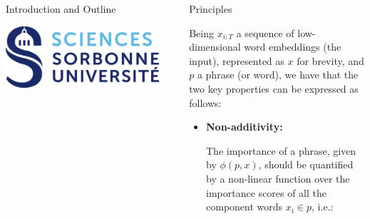 \documentclass[final]{beamer}
\newlength{\sepwid}
\newlength{\onecolwid}
\newlength{\twocolwid}
\begin{document}
\begin{frame}[t]
\begin{columns}[t]
\begin{column}{\onecolwid}
\begin{block}{Introduction and Outline}

\vspace{17pt}
\begin{center}
        \includegraphics[width=0.26\linewidth]{images/logo-sciences-sorbonne-universit.png}
\end{center}

\end{block}

\end{column} %

\begin{column}{\sepwid}\end{column} %

\begin{column}{\twocolwid} %
\begin{columns}[t,totalwidth=\twocolwid] %
\begin{column}{\onecolwid}\vspace{-.6in} %


\begin{block}{Principles}

Being $x_{i:T}$ a sequence of low-dimensional word embeddings (the input), represented as $x$ for brevity, and $p$ a phrase (or word), we have that the two key properties can be expressed as follows:

\begin{itemize}
    \item \textbf{Non-additivity:}
    
    The importance of a phrase, given by $\phi(p, x)$, should be quantified by a non-linear function over the importance scores of all the component words $x_i \in p$, i.e.:
    

\end{itemize}
\end{block}
\end{column}
\end{columns}
\end{column}
\end{columns}
\end{frame}
\end{document}
